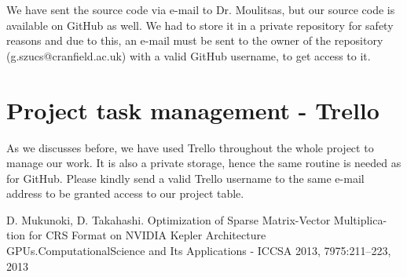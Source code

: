 \documentclass[a4paper, 11pt, article]{report}
\begin{document}
We have sent the source code via e-mail to Dr. Moulitsas, but our source code is available on GitHub as well. We had to store it in a private repository for safety reasons and due to this, an e-mail must be sent to the owner of the repository (g.szucs@cranfield.ac.uk) with a valid GitHub username, to get access to it. 

\section{Project task management - Trello}

As we discusses before, we have used Trello throughout the whole project to manage our work. It is also a private storage, hence the same routine is needed as for GitHub. Please kindly send a valid Trello username to the same e-mail address to be granted access to our project table. 


\begingroup
\renewcommand{\section}[2]{}%
\begin{thebibliography}{1}

 D. Mukunoki, D. Takahashi. Optimization of Sparse Matrix-Vector Multiplica-tion for CRS Format on NVIDIA Kepler Architecture GPUs.ComputationalScience and Its Applications - ICCSA 2013, 7975:211–223, 2013

\end{thebibliography}
\endgroup
   
\end{document}
